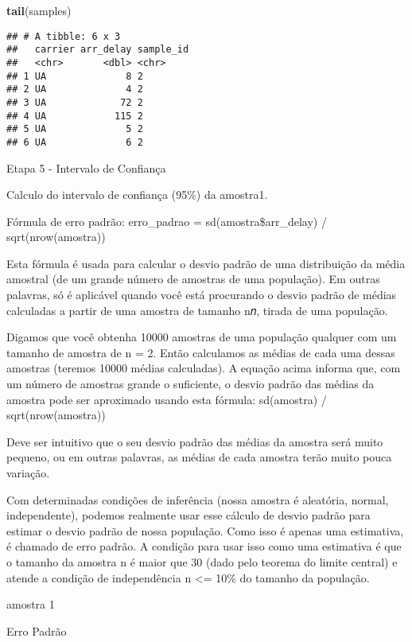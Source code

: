 \documentclass[]{article}
\newenvironment{Shaded}{\begin{snugshade}}{\end{snugshade}}
\newcommand{\KeywordTok}[1]{\textcolor[rgb]{0.13,0.29,0.53}{\textbf{#1}}}
\newcommand{\NormalTok}[1]{#1}
\begin{document}
\begin{Shaded}
\begin{Highlighting}[]
\KeywordTok{tail}\NormalTok{(samples)}
\end{Highlighting}
\end{Shaded}

\begin{verbatim}
## # A tibble: 6 x 3
##   carrier arr_delay sample_id
##   <chr>       <dbl> <chr>    
## 1 UA              8 2        
## 2 UA              4 2        
## 3 UA             72 2        
## 4 UA            115 2        
## 5 UA              5 2        
## 6 UA              6 2
\end{verbatim}

Etapa 5 - Intervalo de Confiança

Calculo do intervalo de confiança (95\%) da amostra1.

Fórmula de erro padrão: erro\_padrao = sd(amostra\$arr\_delay) /
sqrt(nrow(amostra))

Esta fórmula é usada para calcular o desvio padrão de uma distribuição
da média amostral (de um grande número de amostras de uma população). Em
outras palavras, só é aplicável quando você está procurando o desvio
padrão de médias calculadas a partir de uma amostra de tamanho n𝑛,
tirada de uma população.

Digamos que você obtenha 10000 amostras de uma população qualquer com um
tamanho de amostra de n = 2. Então calculamos as médias de cada uma
dessas amostras (teremos 10000 médias calculadas). A equação acima
informa que, com um número de amostras grande o suficiente, o desvio
padrão das médias da amostra pode ser aproximado usando esta fórmula:
sd(amostra) / sqrt(nrow(amostra))

Deve ser intuitivo que o seu desvio padrão das médias da amostra será
muito pequeno, ou em outras palavras, as médias de cada amostra terão
muito pouca variação.

Com determinadas condições de inferência (nossa amostra é aleatória,
normal, independente), podemos realmente usar esse cálculo de desvio
padrão para estimar o desvio padrão de nossa população. Como isso é
apenas uma estimativa, é chamado de erro padrão. A condição para usar
isso como uma estimativa é que o tamanho da amostra n é maior que 30
(dado pelo teorema do limite central) e atende a condição de
independência n \textless{}= 10\% do tamanho da população.

amostra 1

Erro Padrão
\end{document}
